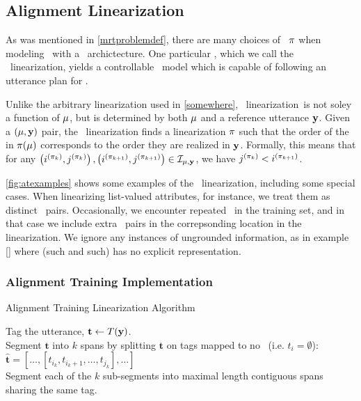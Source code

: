 




\subsection{Alignment Linearization}
As was mentioned in \autoref{mrtproblemdef}, there are many choices of
\linearizationstrategy~$\pi$ when modeling \surfacerealization~with
a \sequencetosequence~archictecture. One particular \linearizationstrategy,
which we call the \alignmenttraining~linearization, yields a controllable \sequencetosequence~model which is capable of following an utterance plan for \surfacerealization. 


Unlike the {\color{red}arbitrary linearization} used in \autoref{somewhere}, \alignmenttraining~linearization~is not soley a function of $\mu$, but is determined by both $\mu$ and a reference utterance $\mathbf{y}$. Given a $\left(\mu, \mathbf{y}\right)$ pair, the \alignmenttraining~linearization finds a linearization
$\pi$ such that the order of the \attributevalues in $\pi(\mu)$ corresponds
to the order they are realized in $\mathbf{y}$. Formally, this means that 
for any $\left(i^{(\pi_k)},j^{(\pi_k)}\right), \left(i^{(\pi_{k+1})},j^{(\pi_{k+1})}\right) \in \mathcal{I}_{\mu,\mathbf{y}}$, we have $j^{(\pi_k)} < i^{(\pi_{k+1})}$.


\autoref{fig:atexamples} shows some examples of the 
\alignmenttraining~linearization, including some special cases. When
linearizing list-valued attributes, for instance, we treat them as distinct
\attributevalue~pairs. Occasionally, we encounter repeated \attributevalues~in the training set, and in that case we include extra \attributevalue~pairs
in the correpsonding location in the linearization. We ignore any instances
of  ungrounded information, as in example \autoref{} where (such and such)
has no explicit representation.  

\subsubsection{Alignment Training Implementation}


\begin{algorithm}[t]
    \caption{Alignment Training Linearization Algorithm}
    \label{alg:at}
    \DontPrintSemicolon
    Tag the utterance, $\mathbf{t} \gets T(\mathbf{y})$.   \\
    Segment $\mathbf{t}$ into $k$ spans by splitting $\mathbf{t}$ on tags mapped to no \attributevalue~(i.e. $t_i = \emptyset$): $\boldsymbol{\hat{t}} = \left[\ldots,\left[t_{{i_k}},t_{i_{k}+1},\ldots, t_{j_k}\right],\ldots\right]$ \\
    Segment each of the $k$ sub-segments into maximal length contiguous
    spans sharing the same tag.
\end{algorithm}

